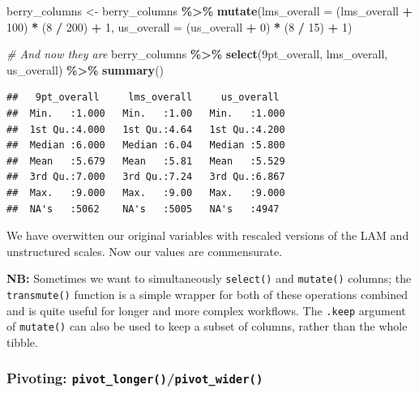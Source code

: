 \documentclass[
]{book}
\newenvironment{Shaded}{\begin{snugshade}}{\end{snugshade}}
\newcommand{\AttributeTok}[1]{\textcolor[rgb]{0.13,0.29,0.53}{#1}}
\newcommand{\CommentTok}[1]{\textcolor[rgb]{0.56,0.35,0.01}{\textit{#1}}}
\newcommand{\DecValTok}[1]{\textcolor[rgb]{0.00,0.00,0.81}{#1}}
\newcommand{\FunctionTok}[1]{\textcolor[rgb]{0.13,0.29,0.53}{\textbf{#1}}}
\newcommand{\NormalTok}[1]{#1}
\newcommand{\OtherTok}[1]{\textcolor[rgb]{0.56,0.35,0.01}{#1}}
\newcommand{\SpecialCharTok}[1]{\textcolor[rgb]{0.81,0.36,0.00}{\textbf{#1}}}
\newcommand{\StringTok}[1]{\textcolor[rgb]{0.31,0.60,0.02}{#1}}
\begin{document}
\begin{Shaded}
\begin{Highlighting}[]
\NormalTok{berry\_columns }\OtherTok{\textless{}{-}} 
\NormalTok{  berry\_columns }\SpecialCharTok{\%\textgreater{}\%}
  \FunctionTok{mutate}\NormalTok{(}\AttributeTok{lms\_overall =}\NormalTok{ (lms\_overall }\SpecialCharTok{+} \DecValTok{100}\NormalTok{) }\SpecialCharTok{*}\NormalTok{ (}\DecValTok{8} \SpecialCharTok{/} \DecValTok{200}\NormalTok{) }\SpecialCharTok{+} \DecValTok{1}\NormalTok{,}
         \AttributeTok{us\_overall =}\NormalTok{ (us\_overall }\SpecialCharTok{+} \DecValTok{0}\NormalTok{) }\SpecialCharTok{*}\NormalTok{ (}\DecValTok{8} \SpecialCharTok{/} \DecValTok{15}\NormalTok{) }\SpecialCharTok{+} \DecValTok{1}\NormalTok{) }

\CommentTok{\# And now they are}
\NormalTok{berry\_columns }\SpecialCharTok{\%\textgreater{}\%} 
  \FunctionTok{select}\NormalTok{(}\StringTok{\textasciigrave{}}\AttributeTok{9pt\_overall}\StringTok{\textasciigrave{}}\NormalTok{, lms\_overall, us\_overall) }\SpecialCharTok{\%\textgreater{}\%}
  \FunctionTok{summary}\NormalTok{()}
\end{Highlighting}
\end{Shaded}

\begin{verbatim}
##   9pt_overall     lms_overall     us_overall   
##  Min.   :1.000   Min.   :1.00   Min.   :1.000  
##  1st Qu.:4.000   1st Qu.:4.64   1st Qu.:4.200  
##  Median :6.000   Median :6.04   Median :5.800  
##  Mean   :5.679   Mean   :5.81   Mean   :5.529  
##  3rd Qu.:7.000   3rd Qu.:7.24   3rd Qu.:6.867  
##  Max.   :9.000   Max.   :9.00   Max.   :9.000  
##  NA's   :5062    NA's   :5005   NA's   :4947
\end{verbatim}

We have overwitten our original variables with rescaled versions of the LAM and unstructured scales. Now our values are commensurate.

\textbf{NB:} Sometimes we want to simultaneously \texttt{select()} and \texttt{mutate()} columns; the \texttt{transmute()} function is a simple wrapper for both of these operations combined and is quite useful for longer and more complex workflows. The \texttt{.keep} argument of \texttt{mutate()} can also be used to keep a subset of columns, rather than the whole tibble.

\hypertarget{pivoting-pivot_longerpivot_wider}{%
\subsubsection{\texorpdfstring{Pivoting: \texttt{pivot\_longer()}/\texttt{pivot\_wider()}}{Pivoting: pivot\_longer()/pivot\_wider()}}\label{pivoting-pivot_longerpivot_wider}}
\end{document}
